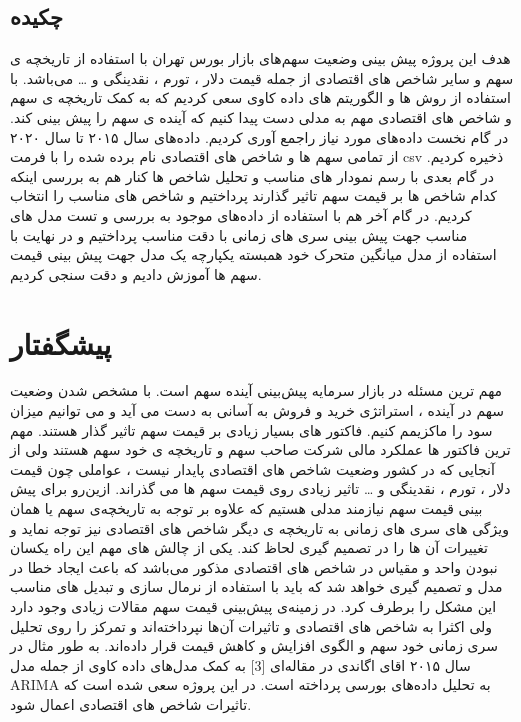 \documentclass[12pt]{report}
\begin{document}
\section*{چکیده}
هدف این پروژه پیش بینی وضعیت سهم‌های بازار بورس تهران با استفاده از تاریخچه ی سهم و سایر شاخص های اقتصادی از جمله قیمت دلار ، تورم ، نقدینگی و … می‌باشد. با استفاده از روش ها و الگوریتم های داده کاوی سعی کردیم که به کمک تاریخچه ی سهم و شاخص های اقتصادی مهم به مدلی دست پیدا کنیم که آینده ی سهم را پیش بینی کند. در گام نخست داده‌های مورد نیاز راجمع آوری کردیم. داده‌های سال ۲۰۱۵ تا سال ۲۰۲۰ از تمامی سهم ها و شاخص های اقتصادی نام برده شده را با فرمت csv ذخیره کردیم. در گام بعدی با رسم نمودار های مناسب و تحلیل شاخص ها کنار هم به بررسی اینکه کدام شاخص ها بر قیمت سهم تاثیر گذارند پرداختیم و شاخص های مناسب را انتخاب کردیم. در گام آخر هم با استفاده از داده‌های موجود به بررسی و تست مدل های مناسب جهت پیش بینی سری های زمانی با دقت مناسب پرداختیم و در نهایت با استفاده از
مدل میانگین متحرک خود همبسته یکپارچه
یک مدل جهت پیش بینی قیمت سهم ها آموزش دادیم و دقت سنجی کردیم.

\chapter*{پیشگفتار }


مهم ترین مسئله در بازار سرمایه پیش‌بینی آینده سهم است. با مشخص شدن وضعیت سهم در آینده ، استراتژی خرید و فروش به آسانی به دست می آید و می توانیم میزان سود را ماکزیمم کنیم. فاکتور های بسیار زیادی بر قیمت سهم تاثیر گذار هستند. مهم ترین فاکتور ها عملکرد مالی شرکت صاحب سهم و تاریخچه ی خود سهم هستند ولی از آنجایی که در کشور وضعیت شاخص های اقتصادی پایدار نیست ، عواملی چون قیمت دلار ، تورم ، نقدینگی و … تاثیر زیادی روی قیمت سهم ها می گذراند. ازین‌رو برای پیش بینی قیمت سهم نیازمند مدلی هستیم که علاوه بر توجه به تاریخچه‌ی سهم یا همان ویژگی های سری های زمانی به تاریخچه ی دیگر شاخص های اقتصادی نیز توجه نماید و تغییرات آن ها را در تصمیم گیری لحاظ کند. یکی از چالش های مهم این راه یکسان نبودن واحد و مقیاس در شاخص های اقتصادی مذکور می‌باشد که باعث ایجاد خطا در مدل و تصمیم گیری خواهد شد که باید با استفاده از نرمال سازی و تبدیل های مناسب این مشکل را برطرف کرد.
در زمینه‌ی پیش‌بینی قیمت سهم مقالات زیادی وجود دارد ولی اکثرا به شاخص های اقتصادی و تاثیرات آن‌ها نپرداخته‌اند و تمرکز را روی تحلیل سری زمانی خود سهم و الگوی افزایش و کاهش قیمت قرار داده‌اند. به طور مثال در سال ۲۰۱۵ اقای اگاندی در مقاله‌ای [3]
به کمک مدل‌های داده کاوی از جمله مدل ARIMA به تحلیل داده‌های بورسی پرداخته است.
در این پروژه سعی شده است که تاثیرات شاخص های اقتصادی اعمال شود.
\end{document}
